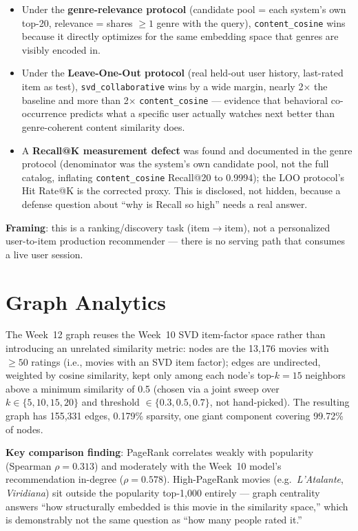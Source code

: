 \documentclass[12pt,a4paper]{article}
\begin{document}
\begin{itemize}[nosep]
  \item Under the \textbf{genre-relevance protocol} (candidate pool = each system's own top-20,
    relevance = shares $\geq1$ genre with the query), \texttt{content\_cosine} wins because it
    directly optimizes for the same embedding space that genres are visibly encoded in.
  \item Under the \textbf{Leave-One-Out protocol} (real held-out user history, last-rated item as
    test), \texttt{svd\_collaborative} wins by a wide margin, nearly 2$\times$ the baseline and more
    than 2$\times$ \texttt{content\_cosine} --- evidence that behavioral co-occurrence predicts what
    a specific user actually watches next better than genre-coherent content similarity does.
  \item A \textbf{Recall@K measurement defect} was found and documented in the genre protocol
    (denominator was the system's own candidate pool, not the full catalog, inflating
    \texttt{content\_cosine} Recall@20 to 0.9994); the LOO protocol's Hit Rate@K is the corrected
    proxy. This is disclosed, not hidden, because a defense question about ``why is Recall so high''
    needs a real answer.
\end{itemize}

\textbf{Framing}: this is a ranking/discovery task (item$\to$item), not a personalized
user-to-item production recommender --- there is no serving path that consumes a live user
session.

\section{Graph Analytics}

The Week~12 graph reuses the Week~10 SVD item-factor space rather than introducing an unrelated
similarity metric: nodes are the 13,176 movies with $\geq50$ ratings (i.e., movies with an SVD item
factor); edges are undirected, weighted by cosine similarity, kept only among each node's top-$k=15$
neighbors above a minimum similarity of 0.5 (chosen via a joint sweep over $k \in \{5,10,15,20\}$
and threshold $\in \{0.3,0.5,0.7\}$, not hand-picked). The resulting graph has 155,331 edges,
0.179\% sparsity, one giant component covering 99.72\% of nodes.

\textbf{Key comparison finding}: PageRank correlates weakly with popularity (Spearman
$\rho=0.313$) and moderately with the Week~10 model's recommendation in-degree ($\rho=0.578$).
High-PageRank movies (e.g.\ \emph{L'Atalante}, \emph{Viridiana}) sit outside the popularity
top-1,000 entirely --- graph centrality answers ``how structurally embedded is this movie in the
similarity space,'' which is demonstrably not the same question as ``how many people rated it.''
\end{document}

